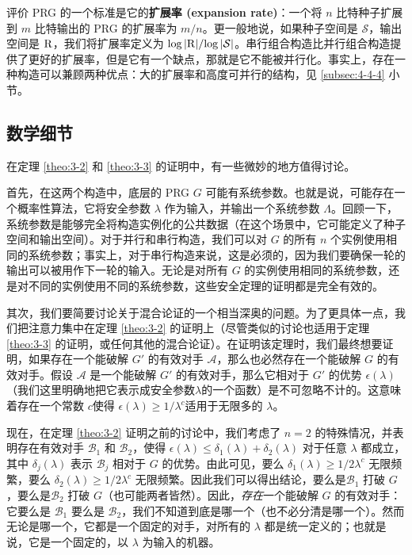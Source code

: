 评价 PRG 的一个标准是它的\textbf{扩展率 (expansion rate)}：一个将 $n$ 比特种子扩展到 $m$ 比特输出的 PRG 的扩展率为 ${m}/{n}$。更一般地说，如果种子空间是 $\mathcal{S}$，输出空间是 $\mathcal{\rm R}$，我们将扩展率定义为 ${\log|\mathcal{\rm R}|}/{\log|\mathcal{S}|}$。串行组合构造比并行组合构造提供了更好的扩展率，但是它有一个缺点，那就是它不能被并行化。事实上，存在一种构造可以兼顾两种优点：大的扩展率和高度可并行的结构，见 \ref{subsec:4-4-4} 小节。

\subsection{数学细节}

在定理 \ref{theo:3-2} 和 \ref{theo:3-3} 的证明中，有一些微妙的地方值得讨论。

首先，在这两个构造中，底层的 PRG $G$ 可能有系统参数。也就是说，可能存在一个概率性算法，它将安全参数 $\lambda$ 作为输入，并输出一个系统参数 $\Lambda$。回顾一下，系统参数是能够完全将构造实例化的公共数据（在这个场景中，它可能定义了种子空间和输出空间）。对于并行和串行构造，我们可以对 $G$ 的所有 $n$ 个实例使用相同的系统参数；事实上，对于串行构造来说，这是必须的，因为我们要确保一轮的输出可以被用作下一轮的输入。无论是对所有 $G$ 的实例使用相同的系统参数，还是对不同的实例使用不同的系统参数，这些安全定理的证明都是完全有效的。

其次，我们要简要讨论关于混合论证的一个相当深奥的问题。为了更具体一点，我们把注意力集中在定理 \ref{theo:3-2} 的证明上（尽管类似的讨论也适用于定理 \ref{theo:3-3} 的证明，或任何其他的混合论证）。在证明该定理时，我们最终想要证明，如果存在一个能破解 $G'$ 的有效对手 $\mathcal A$，那么也必然存在一个能破解 $G$ 的有效对手。假设 $\mathcal A$ 是一个能破解 $G'$ 的有效对手，那么它相对于 $G'$ 的优势 $\epsilon(\lambda)$（我们这里明确地把它表示成安全参数$\lambda$的一个函数）是不可忽略不计的。这意味着存在一个常数 $c$使得 $\epsilon(\lambda)\geq{1}/{\lambda^c}$适用于无限多的 $\lambda$。

现在，在定理 \ref{theo:3-2} 证明之前的讨论中，我们考虑了 $n=2$ 的特殊情况，并表明存在有效对手 $\mathcal{B}_1$ 和 $\mathcal{B}_2$，使得 $\epsilon(\lambda)\leq\delta_1(\lambda)+\delta_2(\lambda)$ 对于任意 $\lambda$ 都成立，其中 $\delta_j(\lambda)$ 表示 $\mathcal{B}_j$ 相对于 $G$ 的优势。由此可见，要么 $\delta_1(\lambda)\geq{1}/{2\lambda^c}$ 无限频繁，要么 $\delta_2(\lambda)\geq{1}/{2\lambda^c}$ 无限频繁。因此我们可以得出结论，要么是$\mathcal{B}_1$ 打破 $G$，要么是$\mathcal{B}_2$ 打破 $G$（也可能两者皆然）。因此，\emph{存在}一个能破解 $G$ 的有效对手：它要么是 $\mathcal{B}_1$ 要么是 $\mathcal{B}_2$，我们不知道到底是哪一个（也不必分清是哪一个）。然而无论是哪一个，它都是一个固定的对手，对所有的 $\lambda$ 都是统一定义的；也就是说，它是一个固定的，以 $\lambda$ 为输入的机器。

